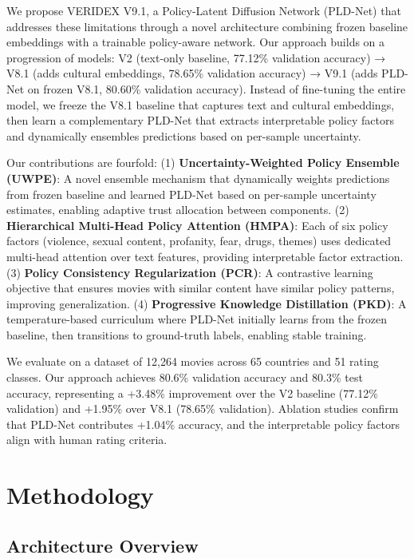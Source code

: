 \documentclass[11pt]{article}
\begin{document}
We propose VERIDEX V9.1, a Policy-Latent Diffusion Network (PLD-Net) that addresses these limitations through a novel architecture combining frozen baseline embeddings with a trainable policy-aware network. Our approach builds on a progression of models: V2 (text-only baseline, 77.12\% validation accuracy) → V8.1 (adds cultural embeddings, 78.65\% validation accuracy) → V9.1 (adds PLD-Net on frozen V8.1, 80.60\% validation accuracy). Instead of fine-tuning the entire model, we freeze the V8.1 baseline that captures text and cultural embeddings, then learn a complementary PLD-Net that extracts interpretable policy factors and dynamically ensembles predictions based on per-sample uncertainty.

Our contributions are fourfold: (1) \textbf{Uncertainty-Weighted Policy Ensemble (UWPE)}: A novel ensemble mechanism that dynamically weights predictions from frozen baseline and learned PLD-Net based on per-sample uncertainty estimates, enabling adaptive trust allocation between components. (2) \textbf{Hierarchical Multi-Head Policy Attention (HMPA)}: Each of six policy factors (violence, sexual content, profanity, fear, drugs, themes) uses dedicated multi-head attention over text features, providing interpretable factor extraction. (3) \textbf{Policy Consistency Regularization (PCR)}: A contrastive learning objective that ensures movies with similar content have similar policy patterns, improving generalization. (4) \textbf{Progressive Knowledge Distillation (PKD)}: A temperature-based curriculum where PLD-Net initially learns from the frozen baseline, then transitions to ground-truth labels, enabling stable training.

We evaluate on a dataset of 12,264 movies across 65 countries and 51 rating classes. Our approach achieves 80.6\% validation accuracy and 80.3\% test accuracy, representing a +3.48\% improvement over the V2 baseline (77.12\% validation) and +1.95\% over V8.1 (78.65\% validation). Ablation studies confirm that PLD-Net contributes +1.04\% accuracy, and the interpretable policy factors align with human rating criteria.

\section{Methodology}

\subsection{Architecture Overview}
\end{document}
